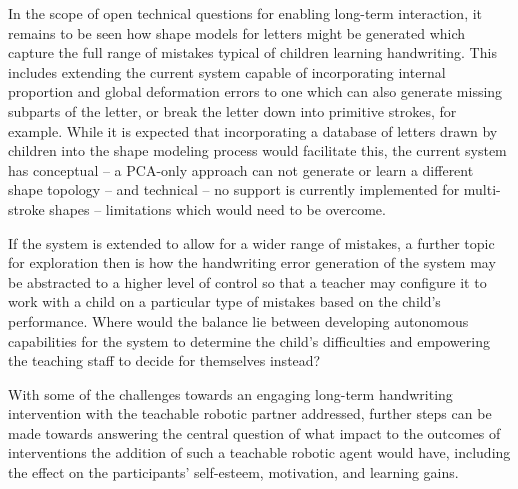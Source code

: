 \documentclass{sig-alternate}
\begin{document}
In the scope of open technical questions for enabling long-term interaction, it remains to be seen how shape models
for letters might be generated which capture the full range of mistakes typical
of children learning handwriting. This includes extending the current system capable of
incorporating internal proportion and global deformation errors to one which can
also generate missing subparts of the letter, or break the letter down into
primitive strokes, for example. While it is expected that incorporating a
database of letters drawn by children into the shape modeling process would
facilitate this, the current system has conceptual -- a PCA-only approach can not
generate or learn a different shape topology -- and technical -- no support is currently implemented for
multi-stroke shapes -- limitations which would need to be overcome.

If the system is extended to allow for a wider range of mistakes, a further 
topic for exploration then is how the handwriting error
generation of the system may be abstracted to a higher level of control so that
a teacher may configure it to work with a child on a particular type of
mistakes based on the child's performance. Where would the balance lie between
developing autonomous capabilities for the system to determine the child's
difficulties and empowering the teaching staff to decide for themselves
instead? 

With some of the challenges towards an engaging long-term handwriting intervention 
with the teachable robotic partner addressed, further steps can be made towards 
answering the central question of what impact to the outcomes of interventions the 
addition of such a teachable robotic agent would have, including the effect on the 
participants' self-esteem, motivation, and learning gains. %



%

%
\end{document}
